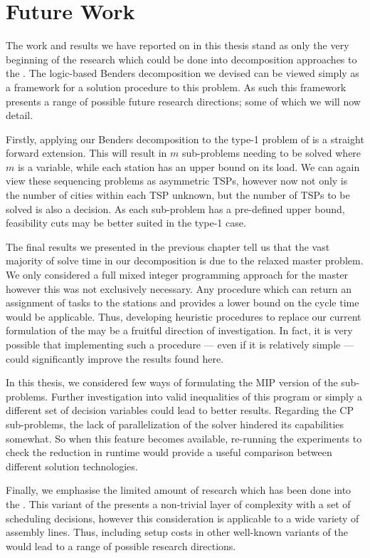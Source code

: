 \section{Future Work}
\label{sec:conc:future}
The work and results we have reported on in this thesis
stand as only the very beginning of the research which
could be done into decomposition approaches to the \sua{}.
The logic-based Benders decomposition we devised can be viewed
simply as a framework for a solution procedure to this problem.
As such this framework presents a range of possible future research directions;
some of which we will now detail.

Firstly, applying our Benders decomposition to the type-1 problem
of \sua{} is a straight forward extension.
This will result in $m$ sub-problems needing to be solved
where $m$ is a variable, while each station has an upper bound
on its load.
We can again view these sequencing problems as asymmetric TSPs, however
now not only is the number of cities within each TSP unknown,
but the number of TSPs to be solved is also a decision.
As each sub-problem has a pre-defined upper bound, feasibility
cuts may be better suited in the type-1 case.

The final results we presented in the previous chapter tell us that
the vast majority of solve time in our decomposition is due to
the relaxed master problem.
We only considered a full mixed integer programming approach for the 
master however this was not exclusively necessary. 
Any procedure which can return an assignment of tasks to the stations and provides 
a lower bound on the cycle time would be applicable.
Thus, developing heuristic procedures to replace our current formulation of
the \rmp{} may be a fruitful direction of investigation.
In fact, it is very possible that implementing such a procedure --- even if it is 
relatively simple --- could significantly improve the results 
found here.

In this thesis, we considered few ways of formulating the MIP
version of the sub-problems.
Further investigation into valid inequalities of this program
or simply a different set of decision variables could lead
to better results.
Regarding the CP sub-problems, the lack of parallelization
of the \chuffed solver hindered its capabilities somewhat.
So when this feature becomes available, re-running the
experiments to check the reduction in runtime 
would provide a useful comparison between different
solution technologies.

Finally, we emphasise the limited amount of research which
has been done into the \sua{}.
This variant of the \albp{} presents a non-trivial layer of complexity
with a set of scheduling decisions,
however this consideration is applicable to a wide variety of assembly lines.
Thus, including setup costs in other well-known variants of the 
\albp{} would lead to a range of possible research directions.

